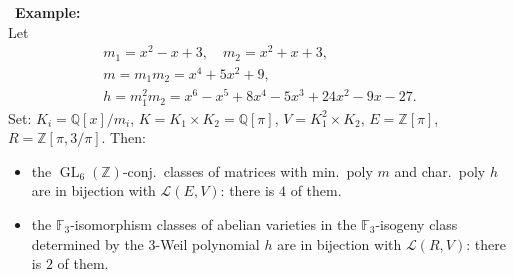 \documentclass[usenames,dvipsnames]{beamer}
\def\Q{\mathbb{Q}}
\def\Z{\mathbb{Z}}
\def\F{\mathbb{F}}
\DeclareMathOperator{\GL}{GL}
\newcommand{\cL}{{\mathcal L}}
\begin{document}
\begin{frame}{}\
   {\bf Example:}\\
   Let
   \begin{gather*}
      m_1 =x^2 - x + 3, \quad
      m_2 = x^2 + x + 3,\\
      m = m_1m_2 = x^4 +5x^2 + 9, \\
      h =m_1^2m_2 = x^6 - x^5 + 8x^4 -5x^3 + 24x^2 - 9x - 27.
  \end{gather*}
  Set: $K_i=\Q[x]/m_i$, $K=K_1\times K_2=\Q[\pi]$, $V=K_1^2\times K_2$, $E=\Z[\pi]$, $R=\Z[\pi,3/\pi]$.
  Then:
  \begin{itemize}
      \item the $\GL_6(\Z)$-conj.~classes of matrices with min.~poly $m$ and char.~poly $h$ are in bijection with $\cL(E,V)$: there is $4$ of them.
      \item the $\F_3$-isomorphism classes of abelian varieties in the $\F_3$-isogeny class determined by the $3$-Weil polynomial $h$ are in bijection with $\cL(R,V)$: there is $2$ of them.
  \end{itemize}
\end{frame}

\end{document}
